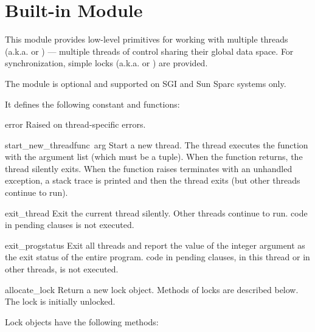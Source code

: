 \section{Built-in Module }

This module provides low-level primitives for working with multiple
threads (a.k.a.  or ) --- multiple
threads of control sharing their global data space.  For
synchronization, simple locks (a.k.a.  or ) are provided.

The module is optional and supported on SGI and Sun Sparc systems only.

It defines the following constant and functions:

\renewcommand{\indexsubitem}{(in module thread)}
\begin{excdesc}{error}
Raised on thread-specific errors.
\end{excdesc}

\begin{funcdesc}{start_new_thread}{func\, arg}
Start a new thread.  The thread executes the function 
with the argument list  (which must be a tuple).  When the
function returns, the thread silently exits.  When the function raises
terminates with an unhandled exception, a stack trace is printed and
then the thread exits (but other threads continue to run).
\end{funcdesc}

\begin{funcdesc}{exit_thread}{}
Exit the current thread silently.  Other threads continue to run.
 code in pending  clauses is not executed.
\end{funcdesc}

\begin{funcdesc}{exit_prog}{status}
Exit all threads and report the value of the integer argument
 as the exit status of the entire program.
 code in pending  clauses, in this thread
or in other threads, is not executed.
\end{funcdesc}

\begin{funcdesc}{allocate_lock}{}
Return a new lock object.  Methods of locks are described below.  The
lock is initially unlocked.
\end{funcdesc}

Lock objects have the following methods:

